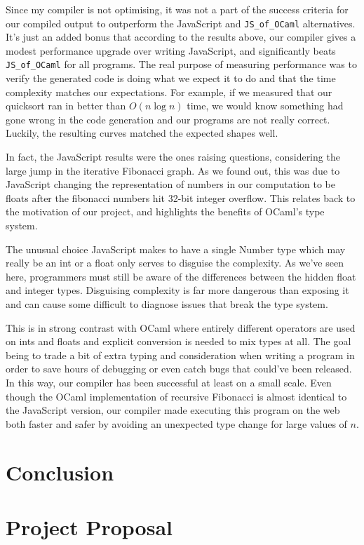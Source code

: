 \documentclass[12pt,a4paper,twoside,openright]{report}
\newcommand{\JSofOCaml}{{\tt JS\_of\_OCaml} }
\begin{document}
Since my compiler is not optimising, it was not a part of the success criteria for our compiled output to outperform the JavaScript and \JSofOCaml alternatives.
It's just an added bonus that according to the results above, our compiler gives a modest performance upgrade over writing JavaScript, and significantly beats \JSofOCaml for all programs.
The real purpose of measuring performance was to verify the generated code is doing what we expect it to do and that the time complexity matches our expectations.
For example, if we measured that our quicksort ran in better than $O(n \log n)$ time, we would know something had gone wrong in the code generation and our programs are not really correct.
Luckily, the resulting curves matched the expected shapes well.

In fact, the JavaScript results were the ones raising questions, considering the large jump in the iterative Fibonacci graph.
As we found out, this was due to JavaScript changing the representation of numbers in our computation to be floats after the fibonacci numbers hit 32-bit integer overflow.
This relates back to the motivation of our project, and highlights the benefits of OCaml's type system.

The unusual choice JavaScript makes to have a single Number type which may really be an int or a float only serves to disguise the complexity.
As we've seen here, programmers must still be aware of the differences between the hidden float and integer types.
Disguising complexity is far more dangerous than exposing it and can cause some difficult to diagnose issues that break the type system.

This is in strong contrast with OCaml where entirely different operators are used on ints and floats and explicit conversion is needed to mix types at all.
The goal being to trade a bit of extra typing and consideration when writing a program in order to save hours of debugging or even catch bugs that could've been released.
In this way, our compiler has been successful at least on a small scale.
Even though the OCaml implementation of recursive Fibonacci is almost identical to the JavaScript version, our compiler made executing this program on the web both faster and safer by avoiding an unexpected type change for large values of $n$.

\chapter{Conclusion}





\appendix

\chapter{Project Proposal}

% 
\end{document}
